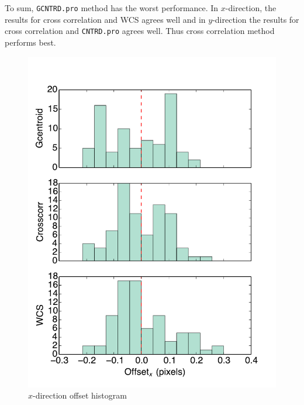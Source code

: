 \documentclass[paper=letter, fontsize=11pt]{scrartcl} %
\numberwithin{equation}{section} %
\numberwithin{figure}{section} %
\numberwithin{table}{section} %
\begin{document}
To sum, \texttt{GCNTRD.pro} method has the worst performance. In
$x$-direction, the results for cross correlation and WCS agrees well
and in $y$-direction the results for cross correlation and
\texttt{CNTRD.pro} agrees well. Thus cross correlation method performs
best.\par

\begin{figure}
  \centering
  \includegraphics[width=\textwidth]{x_off}
  \caption{$x$-direction offset histogram}
  \label{fig:x_off}
\end{figure}
\end{document}
